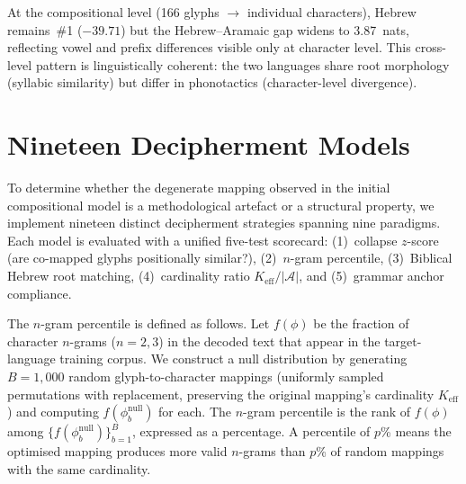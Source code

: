 At the compositional level (166 glyphs $\to$ individual characters), Hebrew remains~\#1 ($-39.71$) but the Hebrew--Aramaic gap widens to 3.87~nats, reflecting vowel and prefix differences visible only at character level.  This cross-level pattern is linguistically coherent: the two languages share root morphology (syllabic similarity) but differ in phonotactics (character-level divergence).

\begin{table}[t]
\caption{Syllabic Bayesian decipherment ranking (six languages).}
\label{tab:ranking}
\centering
{}
\end{table}


\section{Nineteen Decipherment Models}
\label{sec:models}

To determine whether the degenerate mapping observed in the initial compositional model is a methodological artefact or a structural property, we implement nineteen distinct decipherment strategies spanning nine paradigms.  Each model is evaluated with a unified five-test scorecard: (1)~collapse $z$-score (are co-mapped glyphs positionally similar?), (2)~$n$-gram percentile, (3)~Biblical Hebrew root matching, (4)~cardinality ratio $K_{\text{eff}}/|\mathcal{A}|$, and (5)~grammar anchor compliance.

The $n$-gram percentile is defined as follows.  Let $f(\phi)$ be the fraction of character $n$-grams ($n = 2, 3$) in the decoded text that appear in the target-language training corpus.  We construct a null distribution by generating $B = 1{,}000$ random glyph-to-character mappings (uniformly sampled permutations with replacement, preserving the original mapping's cardinality $K_{\text{eff}}$) and computing $f(\phi_b^{\text{null}})$ for each.  The $n$-gram percentile is the rank of $f(\phi)$ among $\{f(\phi_b^{\text{null}})\}_{b=1}^{B}$, expressed as a percentage.  A percentile of $p$\% means the optimised mapping produces more valid $n$-grams than $p$\% of random mappings with the same cardinality.

